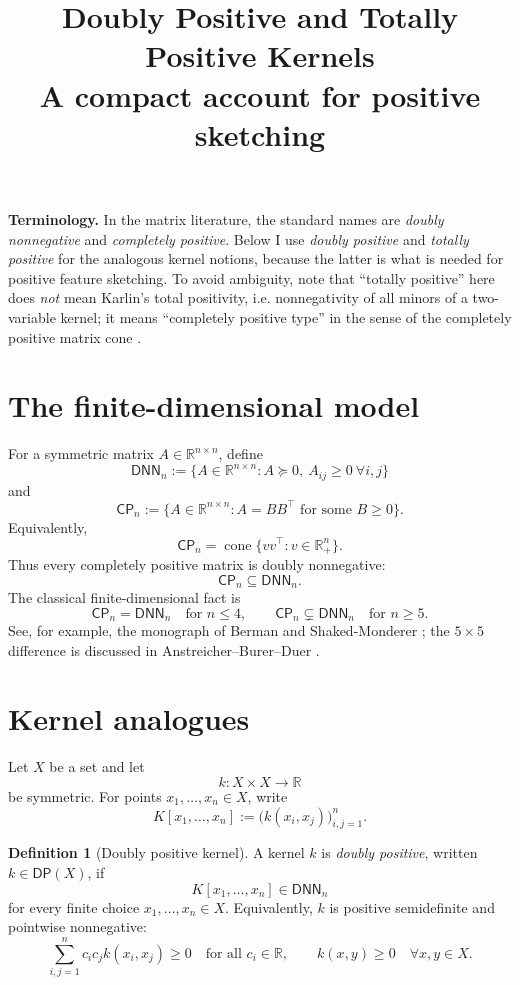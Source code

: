 \documentclass[11pt]{article}
\title{Doubly Positive and Totally Positive Kernels\\
\large A compact account for positive sketching}
\author{}
\date{}
\newcommand{\R}{\mathbb{R}}
\newcommand{\Rp}{\mathbb{R}_{+}}
\newcommand{\DNN}{\mathsf{DNN}}
\newcommand{\CP}{\mathsf{CP}}
\newcommand{\DP}{\mathsf{DP}}
\theoremstyle{definition}
\newtheorem{definition}{Definition}
\theoremstyle{plain}
\theoremstyle{remark}
\begin{document}
\maketitle

\noindent\textbf{Terminology.}
In the matrix literature, the standard names are \emph{doubly nonnegative} and
\emph{completely positive}.  Below I use \emph{doubly positive} and
\emph{totally positive} for the analogous kernel notions, because the latter is
what is needed for positive feature sketching.  To avoid ambiguity, note that
``totally positive'' here does \emph{not} mean Karlin's total positivity, i.e.
nonnegativity of all minors of a two-variable kernel; it means ``completely
positive type'' in the sense of the completely positive matrix cone
\cite{Karlin1968,DeCorte2022}.

\section{The finite-dimensional model}

For a symmetric matrix $A\in\R^{n\times n}$, define
\[
\DNN_n := \{A\in\R^{n\times n}: A\succeq 0,\ A_{ij}\ge 0\ \forall i,j\}
\]
and
\[
\CP_n := \{A\in\R^{n\times n}: A=BB^\top\text{ for some }B\ge 0\}.
\]
Equivalently,
\[
\CP_n=\operatorname{cone}\{vv^\top: v\in\Rp^n\}.
\]
Thus every completely positive matrix is doubly nonnegative:
\[
\CP_n\subseteq \DNN_n.
\]
The classical finite-dimensional fact is
\[
\boxed{\CP_n=\DNN_n\quad\text{for }n\le 4,}
\qquad
\boxed{\CP_n\subsetneq\DNN_n\quad\text{for }n\ge 5.}
\]
See, for example, the monograph of Berman and Shaked-Monderer
\cite{BermanShakedMonderer2003}; the $5\times5$ difference is discussed in
Anstreicher--Burer--Duer \cite{AnstreicherBurerDuer2009}.

\section{Kernel analogues}

Let $X$ be a set and let
\[
k:X\times X\to\R
\]
be symmetric.  For points $x_1,\dots,x_n\in X$, write
\[
K[x_1,\dots,x_n] := \big(k(x_i,x_j)\big)_{i,j=1}^n.
\]

\begin{definition}[Doubly positive kernel]
A kernel $k$ is \emph{doubly positive}, written $k\in\DP(X)$, if
\[
K[x_1,\dots,x_n]\in\DNN_n
\]
for every finite choice $x_1,\dots,x_n\in X$.  Equivalently,
$k$ is positive semidefinite and pointwise nonnegative:
\[
\sum_{i,j=1}^n c_i c_j k(x_i,x_j)\ge 0
\quad\text{for all }c_i\in\R,
\qquad
k(x,y)\ge 0\quad\forall x,y\in X.
\]
\end{definition}
\end{document}
